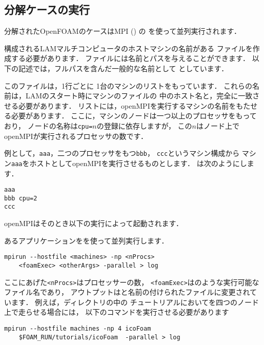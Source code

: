\subsection{分解ケースの実行}
\label{ssec:3.4.2}
分解されたOpenFOAMのケースはMPI () の
%
%
%
%
を使って並列実行されます．

構成されるLAMマルチコンピュータのホストマシンの名前がある
ファイルを作成する必要があります．
ファイルには名前とパスを与えることができます．
以下の記述では，フルパスを含んだ一般的な名前として
としています．

このファイルは，1行ごとに
1台のマシンのリストをもっています．
これらの名前は，LAMのスタート時にマシンのファイルの
中のホスト名と，完全に一致させる必要があります．
リストには，openMPIを実行するマシンの名前をもたせる必要があります．
ここに，マシンのノードは一つ以上のプロセッサをもっており，
ノードの名称は\texttt{cpu=}$n$の登録に依存しますが，
この$n$はノード上でopenMPIが実行されるプロセッサの数です．

例として，\texttt{aaa}，二つのプロセッサをもつ\texttt{bbb}，
\texttt{ccc}というマシン構成から
マシン\texttt{aaa}をホストとしてopenMPIを実行させるものとします．
は次のようにします．
\begin{OFfile}
\begin{verbatim}
aaa
bbb cpu=2
ccc
\end{verbatim}
\end{OFfile}
openMPIはそのとき以下の実行によって起動されます．

あるアプリケーションをを使って並列実行します．
\begin{OFterminal}
\begin{verbatim}
mpirun --hostfile <machines> -np <nProcs>
    <foamExec> <otherArgs> -parallel > log
\end{verbatim}
\end{OFterminal}
ここにあげた\verb|<nProcs>|はプロセッサーの数，
\verb|<foamExec>|はのような実行可能なファイル名であり，
アウトプットはと名前の付けられたファイルに変更されています．
例えば，ディレクトリの中の
チュートリアルにおいてを四つのノード上で走らせる場合には，
以下のコマンドを実行させる必要があります
\begin{OFterminal}
\begin{verbatim}
mpirun --hostfile machines -np 4 icoFoam
    $FOAM_RUN/tutorials/icoFoam  -parallel > log
\end{verbatim}%
\end{OFterminal}

